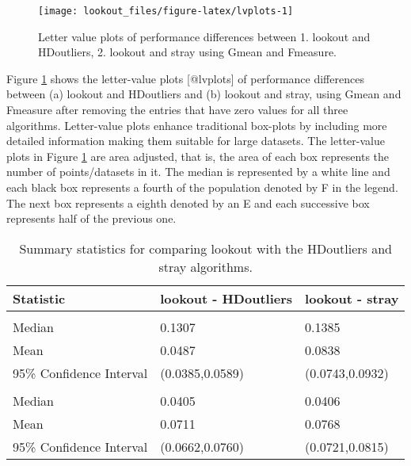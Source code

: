\documentclass[
]{article}
\begin{document}
\begin{figure}
\texttt{[image: lookout\_files/figure-latex/lvplots-1]} \caption{Letter value plots of performance differences between 1. lookout and HDoutliers, 2. lookout and stray using Gmean and Fmeasure.}\label{fig:lvplots}
\end{figure}

Figure \ref{fig:lvplots} shows the letter-value plots {[}@lvplots{]} of
performance differences between (a) lookout and HDoutliers and (b)
lookout and stray, using Gmean and Fmeasure after removing the entries
that have zero values for all three algorithms. Letter-value plots
enhance traditional box-plots by including more detailed information
making them suitable for large datasets. The letter-value plots in
Figure \ref{fig:lvplots} are area adjusted, that is, the area of each
box represents the number of points/datasets in it. The median is
represented by a white line and each black box represents a fourth of
the population denoted by F in the legend. The next box represents a
eighth denoted by an E and each successive box represents half of the
previous one.

\begin{table}

\caption{\label{tab:table}Summary statistics for comparing lookout with the HDoutliers and stray algorithms.}
\centering
\begin{tabular}[t]{lll}
\toprule
Statistic & lookout - HDoutliers & lookout - stray\\
\midrule
\addlinespace[0.3em]
\multicolumn{3}{l}{\textbf{Fmeasure}}\\
\hspace{1em}Median & 0.1307 & 0.1385\\
\hspace{1em}Mean & 0.0487 & 0.0838\\
\hspace{1em}95\% Confidence Interval & (0.0385,0.0589) & (0.0743,0.0932)\\
\addlinespace[0.3em]
\multicolumn{3}{l}{\textbf{Gmean}}\\
\hspace{1em}Median & 0.0405 & 0.0406\\
\hspace{1em}Mean & 0.0711 & 0.0768\\
\hspace{1em}95\% Confidence Interval & (0.0662,0.0760) & (0.0721,0.0815)\\
\bottomrule
\end{tabular}
\end{table}
\end{document}
